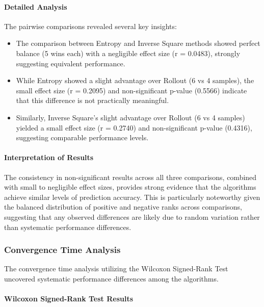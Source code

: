 \documentclass[../report.tex]{subfiles}
\begin{document}
    \paragraph{Detailed Analysis}
    The pairwise comparisons revealed several key insights:
       \begin{itemize}
           \item The comparison between Entropy and Inverse Square methods showed perfect balance (5 wins each) with a negligible effect size (r = 0.0483), strongly suggesting equivalent performance.
           \item While Entropy showed a slight advantage over Rollout (6 vs 4 samples), the small effect size (r = 0.2095) and non-significant p-value (0.5566) indicate that this difference is not practically meaningful.
           \item Similarly, Inverse Square's slight advantage over Rollout (6 vs 4 samples) yielded a small effect size (r = 0.2740) and non-significant p-value (0.4316), suggesting comparable performance levels.
       \end{itemize}
   
    \vspace{0.3cm}

    \paragraph{Interpretation of Results}
    The consistency in non-significant results across all three comparisons, combined with small to negligible effect sizes, provides strong evidence that the algorithms achieve similar levels of prediction accuracy. This is particularly noteworthy given the balanced distribution of positive and negative ranks across comparisons, suggesting that any observed differences are likely due to random variation rather than systematic performance differences.
    
    \vspace{0.3cm}
    
    \subsubsection{Convergence Time Analysis}
   
    The convergence time analysis utilizing the Wilcoxon Signed-Rank Test uncovered systematic performance differences among the algorithms.
   
    \paragraph{Wilcoxon Signed-Rank Test Results}
   
\end{document}
